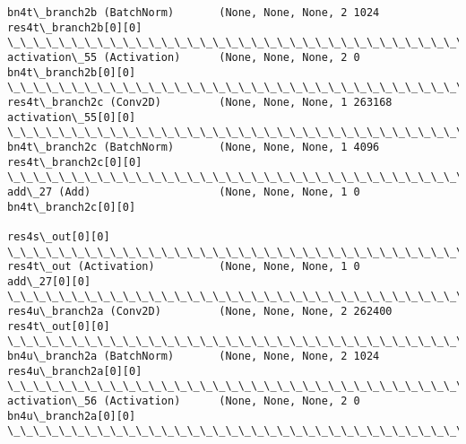 \documentclass[11pt]{article}
\begin{document}
\begin{Verbatim}[commandchars=\\\{\}]
bn4t\_branch2b (BatchNorm)       (None, None, None, 2 1024        res4t\_branch2b[0][0]             
\_\_\_\_\_\_\_\_\_\_\_\_\_\_\_\_\_\_\_\_\_\_\_\_\_\_\_\_\_\_\_\_\_\_\_\_\_\_\_\_\_\_\_\_\_\_\_\_\_\_\_\_\_\_\_\_\_\_\_\_\_\_\_\_\_\_\_\_\_\_\_\_\_\_\_\_\_\_\_\_\_\_\_\_\_\_\_\_\_\_\_\_\_\_\_\_\_\_
activation\_55 (Activation)      (None, None, None, 2 0           bn4t\_branch2b[0][0]              
\_\_\_\_\_\_\_\_\_\_\_\_\_\_\_\_\_\_\_\_\_\_\_\_\_\_\_\_\_\_\_\_\_\_\_\_\_\_\_\_\_\_\_\_\_\_\_\_\_\_\_\_\_\_\_\_\_\_\_\_\_\_\_\_\_\_\_\_\_\_\_\_\_\_\_\_\_\_\_\_\_\_\_\_\_\_\_\_\_\_\_\_\_\_\_\_\_\_
res4t\_branch2c (Conv2D)         (None, None, None, 1 263168      activation\_55[0][0]              
\_\_\_\_\_\_\_\_\_\_\_\_\_\_\_\_\_\_\_\_\_\_\_\_\_\_\_\_\_\_\_\_\_\_\_\_\_\_\_\_\_\_\_\_\_\_\_\_\_\_\_\_\_\_\_\_\_\_\_\_\_\_\_\_\_\_\_\_\_\_\_\_\_\_\_\_\_\_\_\_\_\_\_\_\_\_\_\_\_\_\_\_\_\_\_\_\_\_
bn4t\_branch2c (BatchNorm)       (None, None, None, 1 4096        res4t\_branch2c[0][0]             
\_\_\_\_\_\_\_\_\_\_\_\_\_\_\_\_\_\_\_\_\_\_\_\_\_\_\_\_\_\_\_\_\_\_\_\_\_\_\_\_\_\_\_\_\_\_\_\_\_\_\_\_\_\_\_\_\_\_\_\_\_\_\_\_\_\_\_\_\_\_\_\_\_\_\_\_\_\_\_\_\_\_\_\_\_\_\_\_\_\_\_\_\_\_\_\_\_\_
add\_27 (Add)                    (None, None, None, 1 0           bn4t\_branch2c[0][0]              
                                                                 res4s\_out[0][0]                  
\_\_\_\_\_\_\_\_\_\_\_\_\_\_\_\_\_\_\_\_\_\_\_\_\_\_\_\_\_\_\_\_\_\_\_\_\_\_\_\_\_\_\_\_\_\_\_\_\_\_\_\_\_\_\_\_\_\_\_\_\_\_\_\_\_\_\_\_\_\_\_\_\_\_\_\_\_\_\_\_\_\_\_\_\_\_\_\_\_\_\_\_\_\_\_\_\_\_
res4t\_out (Activation)          (None, None, None, 1 0           add\_27[0][0]                     
\_\_\_\_\_\_\_\_\_\_\_\_\_\_\_\_\_\_\_\_\_\_\_\_\_\_\_\_\_\_\_\_\_\_\_\_\_\_\_\_\_\_\_\_\_\_\_\_\_\_\_\_\_\_\_\_\_\_\_\_\_\_\_\_\_\_\_\_\_\_\_\_\_\_\_\_\_\_\_\_\_\_\_\_\_\_\_\_\_\_\_\_\_\_\_\_\_\_
res4u\_branch2a (Conv2D)         (None, None, None, 2 262400      res4t\_out[0][0]                  
\_\_\_\_\_\_\_\_\_\_\_\_\_\_\_\_\_\_\_\_\_\_\_\_\_\_\_\_\_\_\_\_\_\_\_\_\_\_\_\_\_\_\_\_\_\_\_\_\_\_\_\_\_\_\_\_\_\_\_\_\_\_\_\_\_\_\_\_\_\_\_\_\_\_\_\_\_\_\_\_\_\_\_\_\_\_\_\_\_\_\_\_\_\_\_\_\_\_
bn4u\_branch2a (BatchNorm)       (None, None, None, 2 1024        res4u\_branch2a[0][0]             
\_\_\_\_\_\_\_\_\_\_\_\_\_\_\_\_\_\_\_\_\_\_\_\_\_\_\_\_\_\_\_\_\_\_\_\_\_\_\_\_\_\_\_\_\_\_\_\_\_\_\_\_\_\_\_\_\_\_\_\_\_\_\_\_\_\_\_\_\_\_\_\_\_\_\_\_\_\_\_\_\_\_\_\_\_\_\_\_\_\_\_\_\_\_\_\_\_\_
activation\_56 (Activation)      (None, None, None, 2 0           bn4u\_branch2a[0][0]              
\_\_\_\_\_\_\_\_\_\_\_\_\_\_\_\_\_\_\_\_\_\_\_\_\_\_\_\_\_\_\_\_\_\_\_\_\_\_\_\_\_\_\_\_\_\_\_\_\_\_\_\_\_\_\_\_\_\_\_\_\_\_\_\_\_\_\_\_\_\_\_\_\_\_\_\_\_\_\_\_\_\_\_\_\_\_\_\_\_\_\_\_\_\_\_\_\_\_

\end{Verbatim}
\end{document}
